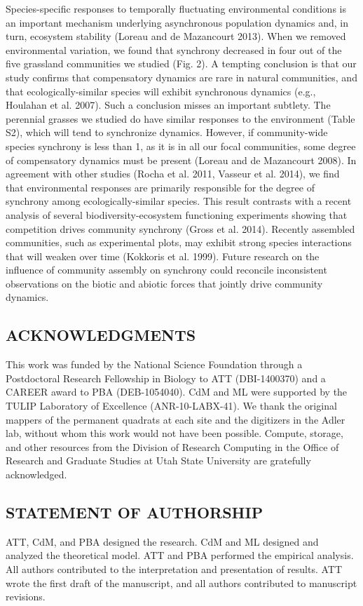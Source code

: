 \documentclass[12pt,]{article}
\begin{document}
Species-specific responses to temporally fluctuating environmental
conditions is an important mechanism underlying asynchronous population
dynamics and, in turn, ecosystem stability (Loreau and {{de Mazancourt}}
2013). When we removed environmental variation, we found that synchrony
decreased in four out of the five grassland communities we studied (Fig.
2). A tempting conclusion is that our study confirms that compensatory
dynamics are rare in natural communities, and that ecologically-similar
species will exhibit synchronous dynamics (e.g., Houlahan et al. 2007).
Such a conclusion misses an important subtlety. The perennial grasses we
studied do have similar responses to the environment (Table S2), which
will tend to synchronize dynamics. However, if community-wide species
synchrony is less than 1, as it is in all our focal communities, some
degree of compensatory dynamics must be present (Loreau and {{de
Mazancourt}} 2008). In agreement with other studies (Rocha et al. 2011,
Vasseur et al. 2014), we find that environmental responses are primarily
responsible for the degree of synchrony among ecologically-similar
species. This result contrasts with a recent analysis of several
biodiversity-ecosystem functioning experiments showing that competition
drives community synchrony (Gross et al. 2014). Recently assembled
communities, such as experimental plots, may exhibit strong species
interactions that will weaken over time (Kokkoris et al. 1999). Future
research on the influence of community assembly on synchrony could
reconcile inconsistent observations on the biotic and abiotic forces
that jointly drive community dynamics.

\subsection{ACKNOWLEDGMENTS}\label{acknowledgments}

This work was funded by the National Science Foundation through a
Postdoctoral Research Fellowship in Biology to ATT (DBI-1400370) and a
CAREER award to PBA (DEB-1054040). CdM and ML were supported by the
TULIP Laboratory of Excellence (ANR-10-LABX-41). We thank the original
mappers of the permanent quadrats at each site and the digitizers in the
Adler lab, without whom this work would not have been possible. Compute,
storage, and other resources from the Division of Research Computing in
the Office of Research and Graduate Studies at Utah State University are
gratefully acknowledged.

\subsection{STATEMENT OF AUTHORSHIP}
ATT, CdM, and PBA designed the research. CdM and ML designed and analyzed the theoretical model. ATT and PBA performed the empirical analysis. All authors contributed to the interpretation and presentation of results. ATT wrote the first draft of the manuscript, and all authors contributed to manuscript revisions.
\end{document}
